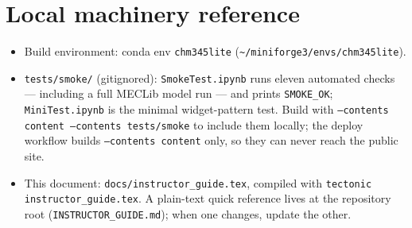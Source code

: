 \documentclass[11pt]{article}
\newcommand{\code}[1]{\texttt{\small #1}}
\begin{document}
\section{Local machinery reference}

\begin{itemize}[itemsep=2pt]
  \item Build environment: conda env \code{chm345lite}
    (\code{\textasciitilde/miniforge3/envs/chm345lite}).
  \item \code{tests/smoke/} (gitignored): \code{SmokeTest.ipynb} runs eleven
    automated checks --- including a full MECLib model run --- and prints
    \code{SMOKE\_OK}; \code{MiniTest.ipynb} is the minimal widget-pattern
    test. Build with \code{--contents content --contents tests/smoke} to
    include them locally; the deploy workflow builds \code{--contents content}
    only, so they can never reach the public site.
  \item This document: \code{docs/instructor\_guide.tex}, compiled with
    \code{tectonic instructor\_guide.tex}. A plain-text quick reference lives
    at the repository root (\code{INSTRUCTOR\_GUIDE.md}); when one changes,
    update the other.
\end{itemize}
\end{document}
